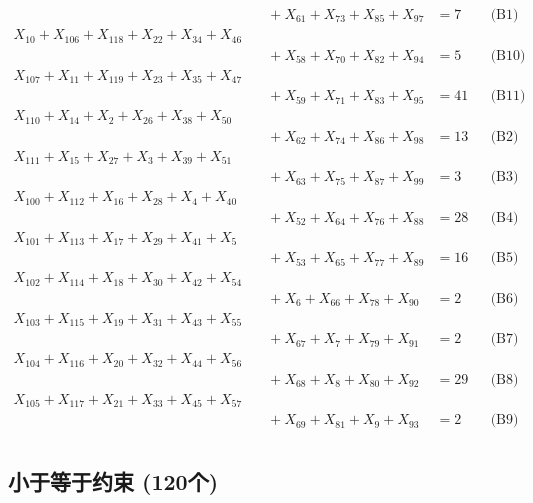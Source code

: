 \documentclass[a4paper,10pt]{article}
\begin{document}
{\begin{align}
&\quad  + X_{61} + X_{73} + X_{85} + X_{97} &= 7 && \text{(B1)} \\
X_{10} + X_{106} + X_{118} + X_{22} + X_{34} + X_{46} \\[0.5ex]
&\quad  + X_{58} + X_{70} + X_{82} + X_{94} &= 5 && \text{(B10)} \\
X_{107} + X_{11} + X_{119} + X_{23} + X_{35} + X_{47} \\[0.5ex]
&\quad  + X_{59} + X_{71} + X_{83} + X_{95} &= 41 && \text{(B11)} \\
X_{110} + X_{14} + X_{2} + X_{26} + X_{38} + X_{50} \\[0.5ex]
&\quad  + X_{62} + X_{74} + X_{86} + X_{98} &= 13 && \text{(B2)} \\
X_{111} + X_{15} + X_{27} + X_{3} + X_{39} + X_{51} \\[0.5ex]
&\quad  + X_{63} + X_{75} + X_{87} + X_{99} &= 3 && \text{(B3)} \\
X_{100} + X_{112} + X_{16} + X_{28} + X_{4} + X_{40} \\[0.5ex]
&\quad  + X_{52} + X_{64} + X_{76} + X_{88} &= 28 && \text{(B4)} \\
X_{101} + X_{113} + X_{17} + X_{29} + X_{41} + X_{5} \\[0.5ex]
&\quad  + X_{53} + X_{65} + X_{77} + X_{89} &= 16 && \text{(B5)} \\
X_{102} + X_{114} + X_{18} + X_{30} + X_{42} + X_{54} \\[0.5ex]
&\quad  + X_{6} + X_{66} + X_{78} + X_{90} &= 2 && \text{(B6)} \\
X_{103} + X_{115} + X_{19} + X_{31} + X_{43} + X_{55} \\[0.5ex]
&\quad  + X_{67} + X_{7} + X_{79} + X_{91} &= 2 && \text{(B7)} \\
\allowbreak
X_{104} + X_{116} + X_{20} + X_{32} + X_{44} + X_{56} \\[0.5ex]
&\quad  + X_{68} + X_{8} + X_{80} + X_{92} &= 29 && \text{(B8)} \\
X_{105} + X_{117} + X_{21} + X_{33} + X_{45} + X_{57} \\[0.5ex]
&\quad  + X_{69} + X_{81} + X_{9} + X_{93} &= 2 && \text{(B9)} \\
\end{align}}

\subsection{小于等于约束 (120个)}
\end{document}
